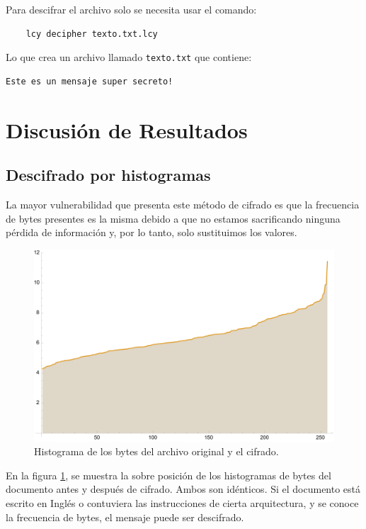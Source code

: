 \documentclass[a4paper]{article}
\begin{document}
Para descifrar el archivo solo se necesita usar el comando:

\begin{verbatim}
    lcy decipher texto.txt.lcy
\end{verbatim}

Lo que crea un archivo llamado \texttt{texto.txt} que contiene:

\begin{verbatim}
Este es un mensaje super secreto!

\end{verbatim}

\newpage
\section{Discusión de Resultados}

\subsection{Descifrado por histogramas}

La mayor vulnerabilidad que presenta este método de cifrado es que la
frecuencia de bytes presentes es la misma debido a que no estamos
sacrificando ninguna pérdida de información y, por lo tanto, solo sustituimos
los
valores.

\begin{figure}[H]
    \centering
    \includegraphics[width=\textwidth]{historygram.png}
    \caption{Histograma de los bytes del archivo
original y el cifrado.}
    \label{fig:Histo1}
\end{figure}

En la figura \ref{fig:Histo1}, se muestra la sobre posición de los histogramas
de bytes del documento antes y después de cifrado. Ambos son idénticos. Si el
documento está escrito en Inglés o contuviera las instrucciones de cierta
arquitectura, y se conoce la frecuencia de bytes, el mensaje puede ser
descifrado.
\end{document}

